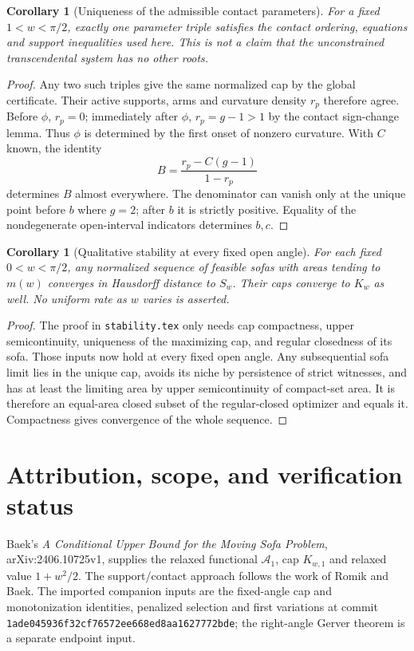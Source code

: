 \documentclass[11pt]{article}
\newtheorem{corollary}[theorem]{Corollary}
\theoremstyle{remark}\newtheorem{remark}[theorem]{Remark}
\begin{document}
\begin{corollary}[Uniqueness of the admissible contact parameters]
For a fixed $1<w<\pi/2$, exactly one parameter triple satisfies the contact ordering, equations and support inequalities used here. This is not a claim that the unconstrained transcendental system has no other roots.
\end{corollary}
\begin{proof}
Any two such triples give the same normalized cap by the global certificate. Their active supports, arms and curvature density $r_p$ therefore agree. Before $\phi$, $r_p=0$; immediately after $\phi$, $r_p=g-1>1$ by the contact sign-change lemma. Thus $\phi$ is determined by the first onset of nonzero curvature. With $C$ known, the identity
\[
 B=\frac{r_p-C(g-1)}{1-r_p}
\]
determines $B$ almost everywhere. The denominator can vanish only at the unique point before $b$ where $g=2$; after $b$ it is strictly positive. Equality of the nondegenerate open-interval indicators determines $b,c$.
\end{proof}

\begin{corollary}[Qualitative stability at every fixed open angle]
For each fixed $0<w<\pi/2$, any normalized sequence of feasible sofas with areas tending to $m(w)$ converges in Hausdorff distance to $S_w$. Their caps converge to $K_w$ as well. No uniform rate as $w$ varies is asserted.
\end{corollary}
\begin{proof}
The proof in \texttt{stability.tex} only needs cap compactness, upper semicontinuity, uniqueness of the maximizing cap, and regular closedness of its sofa. Those inputs now hold at every fixed open angle. Any subsequential sofa limit lies in the unique cap, avoids its niche by persistence of strict witnesses, and has at least the limiting area by upper semicontinuity of compact-set area. It is therefore an equal-area closed subset of the regular-closed optimizer and equals it. Compactness gives convergence of the whole sequence.
\end{proof}

\section{Attribution, scope, and verification status}
Baek's \emph{A Conditional Upper Bound for the Moving Sofa Problem}, arXiv:2406.10725v1, supplies the relaxed functional $\mathcal A_1$, cap $K_{w,1}$ and relaxed value $1+w^2/2$. The support/contact approach follows the work of Romik and Baek. The imported companion inputs are the fixed-angle cap and monotonization identities, penalized selection and first variations at commit \texttt{1ade045936f32cf76572ee668ed8aa1627772bde}; the right-angle Gerver theorem is a separate endpoint input.
\end{document}
